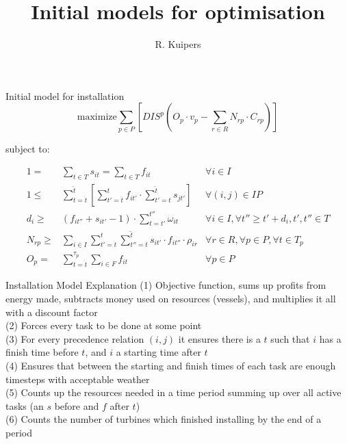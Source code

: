 \documentclass{beamer}
\title[Initial models for optimisation]{Initial models for optimisation}
\author{R. Kuipers}
\begin{document}
\begin{frame}
  \titlepage
\end{frame}

\begin{frame}{Initial model for installation}
\footnotesize
\begin{equation}
	\text{maximize} \sum_{p \in P} [ DIS^p (O_p \cdot v_p - \sum_{r \in R} N_{rp} \cdot C_{rp}) ]
\end{equation}

\bigskip
subject to:

\begin{align}
1 =& \sum_{t \in T} s_{it}	= \sum_{t \in T} f_{it}										&	\forall i \in I 						\\
1 \leq& \sum_{t = \dot{t}}^{\hat{t}} [ \sum_{t' = \dot{t}}^t f_{it'} \cdot \sum_{t' = t}^{\hat{t}} s_{jt'} ]	&	\forall (i, j) \in IP					\\
d_i \geq& (f_{it''} + s_{it'} - 1) \cdot \sum_{t = t'}^{t''} \omega_{it} 							& 	\forall i \in I, 	\forall t'' \geq t' + d_i, t', t'' \in T	\\
N_{rp} \geq& \sum_{i\in I} \sum_{t' = \dot{t}}^t \sum_{t'' = t}^{\hat{t}} s_{it'} \cdot f_{it''} \cdot \rho_{ir}	& 	\forall r \in R, \forall p \in P, \forall t \in T_p 	\\
O_p =&  \sum_{ t = \dot{t}}^{\tau_p} \sum_{i \in F} f_{it}									&	\forall p \in P
\end{align}

\end{frame}

\begin{frame}{Installation Model Explanation}
(1) Objective function, sums up profits from energy made, subtracts money used on resources (vessels), and multiplies it all with a discount factor	\\
(2) Forces every task to be done at some point	\\
(3) For every precedence relation $(i, j)$ it ensures there is a $t$ such that $i$ has a finish time before $t$, and $i$ a starting time after $t$	\\
(4) Ensures that between the starting and finish times of each task are enough timesteps with acceptable weather	\\
(5) Counts up the resources needed in a time period summing up over all active tasks (an $s$ before and $f$ after $t$)	\\
(6) Counts the number of turbines which finished installing by the end of a period	
\end{frame}
\end{document}
